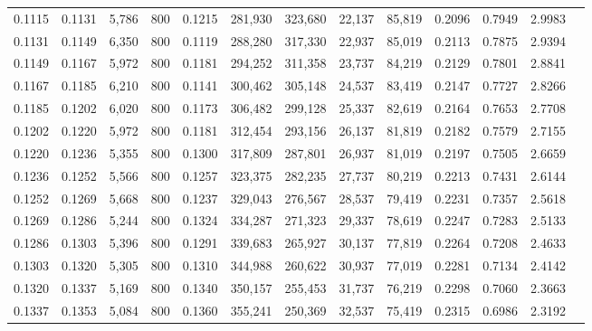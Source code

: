 \begin{tabular}{rrrrrrrrrrrrr}
0.1115 & 0.1131 &  5,786 & 800 &                                     0.1215 & 281,930 & 323,680 &  22,137 &  85,819 & 0.2096 & 0.7949 & 2.9983 \\
0.1131 & 0.1149 &  6,350 & 800 &                                     0.1119 & 288,280 & 317,330 &  22,937 &  85,019 & 0.2113 & 0.7875 & 2.9394 \\
0.1149 & 0.1167 &  5,972 & 800 &                                     0.1181 & 294,252 & 311,358 &  23,737 &  84,219 & 0.2129 & 0.7801 & 2.8841 \\
0.1167 & 0.1185 &  6,210 & 800 &                                     0.1141 & 300,462 & 305,148 &  24,537 &  83,419 & 0.2147 & 0.7727 & 2.8266 \\
0.1185 & 0.1202 &  6,020 & 800 &                                     0.1173 & 306,482 & 299,128 &  25,337 &  82,619 & 0.2164 & 0.7653 & 2.7708 \\
0.1202 & 0.1220 &  5,972 & 800 &                                     0.1181 & 312,454 & 293,156 &  26,137 &  81,819 & 0.2182 & 0.7579 & 2.7155 \\
0.1220 & 0.1236 &  5,355 & 800 &                                     0.1300 & 317,809 & 287,801 &  26,937 &  81,019 & 0.2197 & 0.7505 & 2.6659 \\
0.1236 & 0.1252 &  5,566 & 800 &                                     0.1257 & 323,375 & 282,235 &  27,737 &  80,219 & 0.2213 & 0.7431 & 2.6144 \\
0.1252 & 0.1269 &  5,668 & 800 &                                     0.1237 & 329,043 & 276,567 &  28,537 &  79,419 & 0.2231 & 0.7357 & 2.5618 \\
0.1269 & 0.1286 &  5,244 & 800 &                                     0.1324 & 334,287 & 271,323 &  29,337 &  78,619 & 0.2247 & 0.7283 & 2.5133 \\
0.1286 & 0.1303 &  5,396 & 800 &                                     0.1291 & 339,683 & 265,927 &  30,137 &  77,819 & 0.2264 & 0.7208 & 2.4633 \\
0.1303 & 0.1320 &  5,305 & 800 &                                     0.1310 & 344,988 & 260,622 &  30,937 &  77,019 & 0.2281 & 0.7134 & 2.4142 \\
0.1320 & 0.1337 &  5,169 & 800 &                                     0.1340 & 350,157 & 255,453 &  31,737 &  76,219 & 0.2298 & 0.7060 & 2.3663 \\
0.1337 & 0.1353 &  5,084 & 800 &                                     0.1360 & 355,241 & 250,369 &  32,537 &  75,419 & 0.2315 & 0.6986 & 2.3192 \\

\end{tabular}
